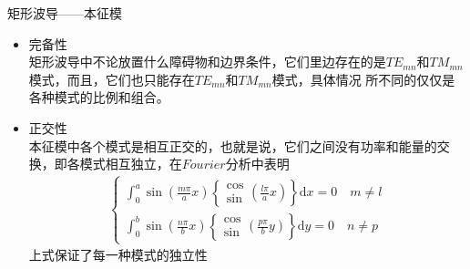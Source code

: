 \begin{frame}{矩形波导——本征模}
    \begin{itemize}
        \item 完备性\\
              矩形波导中不论放置什么障碍物和边界条件，它们里边存在的是$TE_{mn}$和$TM_{mn}$模式，而且，它们也只能存在$TE_{mn}$和$TM_{mn}$模式，具体情况
              所不同的仅仅是各种模式的比例和组合。
        \item 正交性\\
              本征模中各个模式是相互正交的，也就是说，它们之间没有功率和能量的交换，即各模式相互独立，在$Fourier$分析中表明
              \begin{align*}
                  \begin{cases}
                      \int_0^a\sin\left(\frac{m\pi}{a}x\right)\left\{\begin{aligned}\cos \\ \sin\end{aligned}\left(\frac{l\pi}{a}x\right)\right\}\mathrm{d}x=0 \quad m\neq l \\
                      \int_0^b\sin\left(\frac{n\pi}{b}x\right)\left\{\begin{aligned}\cos \\ \sin\end{aligned}\left(\frac{p\pi}{b}y\right)\right\}\mathrm{d}y=0 \quad n\neq p
                  \end{cases}
              \end{align*}
              上式保证了每一种模式的独立性
    \end{itemize}
\end{frame}

